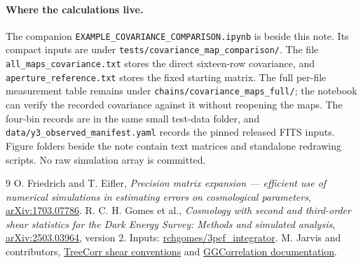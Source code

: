 \documentclass[11pt]{article}
\begin{document}
\paragraph{Where the calculations live.}
The companion \nolinkurl{EXAMPLE_COVARIANCE_COMPARISON.ipynb} is beside
this note. Its compact inputs are under
\nolinkurl{tests/covariance_map_comparison/}. The file
\nolinkurl{all_maps_covariance.txt} stores the direct sixteen-row covariance,
and \nolinkurl{aperture_reference.txt} stores the fixed starting matrix.
The full per-file measurement table remains under
\nolinkurl{chains/covariance_maps_full/}; the notebook can verify the
recorded covariance against it without reopening the maps.
The four-bin records are in the same small test-data folder, and
\nolinkurl{data/y3_observed_manifest.yaml} records the pinned released
FITS inputs. Figure folders beside the note contain text matrices and
standalone redrawing scripts. No raw simulation array is committed.

\begin{thebibliography}{9}
 O. Friedrich and T. Eifler,
\emph{Precision matrix expansion --- efficient use of numerical simulations
in estimating errors on cosmological parameters},
\href{https://arxiv.org/abs/1703.07786}{arXiv:1703.07786}.
 R. C. H. Gomes et al.,
\emph{Cosmology with second and third-order shear statistics for the Dark
Energy Survey: Methods and simulated analysis},
\href{https://arxiv.org/abs/2503.03964}{arXiv:2503.03964}, version 2.
Inputs: \href{https://github.com/rchgomes/3pcf_integrator}
{rchgomes/3pcf\_integrator}.
 M. Jarvis and contributors,
\href{https://rmjarvis.github.io/TreeCorr/_build/html/shear.html}
{TreeCorr shear conventions} and
\href{https://rmjarvis.github.io/TreeCorr/_build/html/gg.html}
{GGCorrelation documentation}.
\end{thebibliography}
\end{document}

